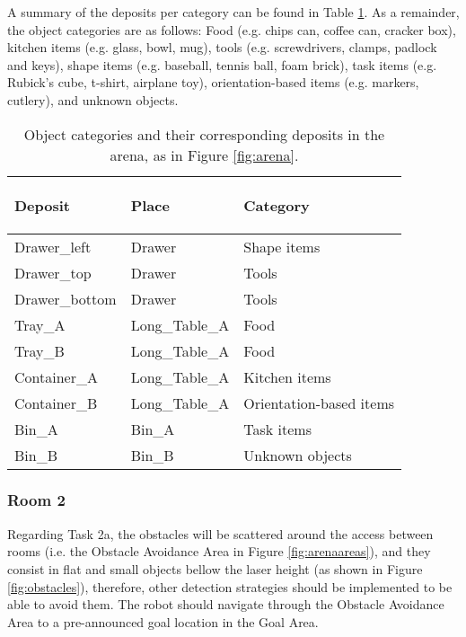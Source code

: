 \documentclass{article}
\begin{document}
A summary of the deposits per category can be found in Table \ref{table:deposits}. As a remainder, the object categories are as follows: Food (e.g. chips can, coffee can, cracker box), kitchen items (e.g. glass, bowl, mug), tools (e.g. screwdrivers, clamps, padlock and keys), shape items (e.g. baseball, tennis ball, foam brick), task items (e.g. Rubick’s cube, t-shirt, airplane toy), orientation-based items (e.g. markers, cutlery), and unknown objects.

\begin{table}[h!]
\begin{center}
\begin{tabular}{ |m{2.5cm}|m{2.5cm}|m{4.0cm}| } 
    \hline
    \begin{center} \textbf{Deposit} \end{center} & 
    \begin{center} \textbf{Place} \end{center} &
    \begin{center} \textbf{Category} \end{center}\\
    \hline
    Drawer\_left & Drawer & Shape items \\
    \hline
    Drawer\_top & Drawer & Tools \\
    \hline
    Drawer\_bottom & Drawer & Tools \\
    \hline
    Tray\_A & Long\_Table\_A & Food \\
    \hline
    Tray\_B & Long\_Table\_A & Food \\
    \hline
    Container\_A & Long\_Table\_A & Kitchen items \\
    \hline
    Container\_B & Long\_Table\_A & Orientation-based items \\
    \hline
    Bin\_A & Bin\_A & Task items\\
    \hline
    Bin\_B & Bin\_B & Unknown objects \\
    \hline
\end{tabular}
\end{center}
\caption{Object categories and their corresponding deposits in the arena, as in Figure \ref{fig:arena}.}
\label{table:deposits}
\end{table}

\subsubsection{Room 2}

Regarding Task 2a, the obstacles will be scattered around the access between rooms (i.e. the Obstacle Avoidance Area in Figure \ref{fig:arenaareas}), and they consist in flat and small objects bellow the laser height (as shown in Figure \ref{fig:obstacles}), therefore, other detection strategies should be implemented to be able to avoid them. The robot should navigate through the Obstacle Avoidance Area to a pre-announced goal location in the Goal Area.
\end{document}
